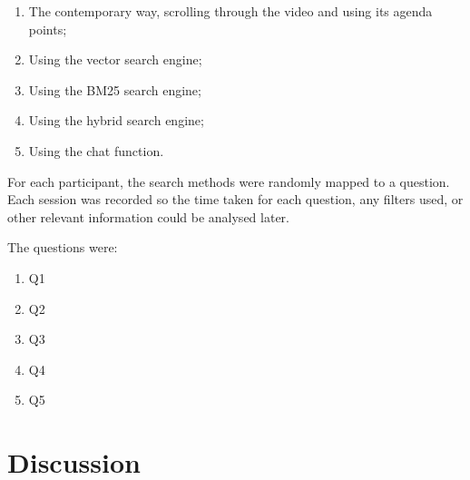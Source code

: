 \documentclass[twoside]{uva-inf-bachelor-thesis}
\begin{document}
\begin{enumerate}
    \item The contemporary way, scrolling through the video and using its agenda points;
    \item Using the vector search engine;
    \item Using the BM25 search engine;
    \item Using the hybrid search engine;
    \item Using the chat function.
\end{enumerate}

For each participant, the search methods were randomly mapped to a question. 
Each session was recorded so the time taken for each question, any filters used, or other relevant information could be analysed later.

The questions were:
\begin{enumerate}
    \item Q1
    \item Q2
    \item Q3
    \item Q4
    \item Q5
\end{enumerate}

\chapter{Discussion}

\printbibliography
\end{document}
